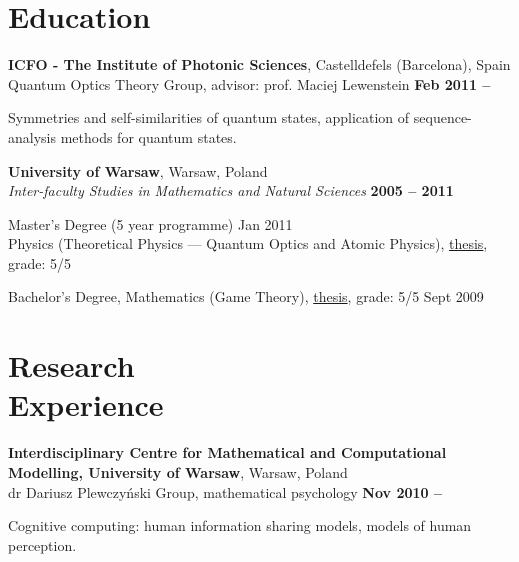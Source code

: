 \documentclass[margin,line]{resume}
\begin{document}
\begin{resume}

    \section{\mysidestyle Education}
    
    {\bf ICFO - The Institute of Photonic Sciences},  Castelldefels (Barcelona), Spain \\%
    Quantum Optics Theory Group, advisor: prof. Maciej Lewenstein \hfill {\bf Feb 2011 -- }\\
   \begin{list2}
        \vspace*{-4mm}
        \item Symmetries and self-similarities of quantum states, application of sequence-analysis methods for quantum states.
    \end{list2}

    {\bf University of Warsaw}, Warsaw, Poland \\
    {\sl Inter-faculty Studies in Mathematics and Natural Sciences} \hfill {\bf 2005 -- 2011}\\
    \begin{list2}
      \vspace*{-4mm}
      \item Master's Degree  (5 year programme) {\hfill Jan 2011}\\
      Physics (Theoretical Physics --- Quantum Optics and Atomic Physics),
      \href{http://migdal.wikidot.com/en:collective-decoherence}{thesis}, grade: 5/5
      \item Bachelor's Degree, Mathematics (Game Theory),
      \href{http://migdal.wikidot.com/en:mafia}{thesis}, grade: 5/5 \hfill Sept 2009
    \end{list2}
    
\vspace{3mm}

    \section{\mysidestyle Research\\Experience}

	{\bf  Interdisciplinary Centre for Mathematical and Computational Modelling, University of Warsaw}, Warsaw, Poland\\
	dr Dariusz Plewczyński Group, mathematical psychology \hfill {\bf Nov 2010 -- }\\
    \begin{list2}
        \vspace*{-4mm}
        \item Cognitive computing: human information sharing models, models of human perception.
    \end{list2}


\end{resume}
\end{document}
